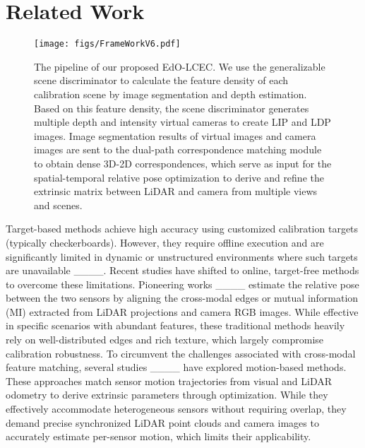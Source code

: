 \section{Related Work}
\label{sec.relate_works}

\begin{figure*}[t!]
    \centering
    \texttt{[image: figs/FrameWorkV6.pdf]}
    \caption{The pipeline of our proposed EdO-LCEC. We use the generalizable scene discriminator to calculate the feature density of each calibration scene by image segmentation and depth estimation. Based on this feature density, the scene discriminator generates multiple depth and intensity virtual cameras to create LIP and LDP images. Image segmentation results of virtual images and camera images are sent to the dual-path correspondence matching module to obtain dense 3D-2D correspondences, which serve as input for the spatial-temporal relative pose optimization to derive and refine the extrinsic matrix between LiDAR and camera from multiple views and scenes.
    }
    \label{fig.framework_overview}
    \vspace{-1em}
\end{figure*}

Target-based methods achieve high accuracy using customized calibration targets (typically checkerboards). However, they require offline execution and are significantly limited in dynamic or unstructured environments where such targets are unavailable ____. Recent studies have shifted to online, target-free methods to overcome these limitations. Pioneering works ____ estimate the relative pose between the two sensors by aligning the cross-modal edges or mutual information (MI) extracted from LiDAR projections and camera RGB images. While effective in specific scenarios with abundant features, these traditional methods heavily rely on well-distributed edges and rich texture, which largely compromise calibration robustness. 
To circumvent the challenges associated with cross-modal feature matching, several studies ____ have explored motion-based methods. These approaches match sensor motion trajectories from visual and LiDAR odometry to derive extrinsic parameters through optimization. While they effectively accommodate heterogeneous sensors without requiring overlap, they demand precise synchronized LiDAR point clouds and camera images to accurately estimate per-sensor motion, which limits their applicability.

